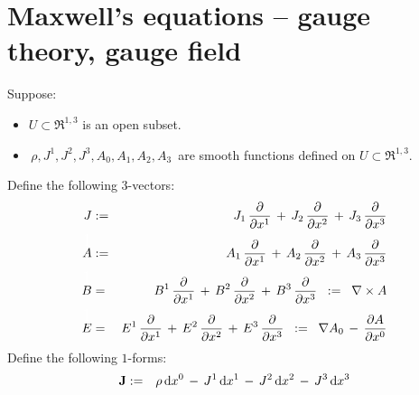 

\section{Maxwell's equations -- gauge theory, gauge field}
\setcounter{theorem}{0}
\setcounter{equation}{0}

\renewcommand{\theenumi}{\roman{enumi}}
\renewcommand{\labelenumi}{\textnormal{(\theenumi)}$\;\;$}


\begin{theorem}
\mbox{}
\vskip 0.2cm
\noindent
Suppose:
\begin{itemize}
\item
	$U \subset \Re^{1,3}$ is an open subset.
\item
	\,$\rho, J^{1}, J^{2}, J^{3}, A_{0}, A_{1}, A_{2}, A_{3}$\,
	are smooth functions defined on $U \subset \Re^{1,3}$.
\end{itemize}
\vskip 0.3cm
\noindent
Define the following $3$-vectors:
\begin{eqnarray*}
J
& := &
	J_{1}\,\dfrac{\partial}{\partial x^{1}} \,+\, J_{2}\,\dfrac{\partial}{\partial x^{2}} \,+\, J_{3}\,\dfrac{\partial}{\partial x^{3}}
\\
\overset{{\color{white}\textnormal{\Large$1$}}}{A}
& := &
	A_{1}\,\dfrac{\partial}{\partial x^{1}} \,+\, A_{2}\,\dfrac{\partial}{\partial x^{2}} \,+\, A_{3}\,\dfrac{\partial}{\partial x^{3}}
\\
\overset{{\color{white}\textnormal{\Large$1$}}}{B}
& = &
	B^{1}\,\dfrac{\partial}{\partial x^{1}} \,+\, B^{2}\,\dfrac{\partial}{\partial x^{2}} \,+\, B^{3}\,\dfrac{\partial}{\partial x^{3}}
\;\; := \;\;
	\nabla \times A
\\
\overset{{\color{white}\textnormal{\Large$1$}}}{E}
& = &
	E^{1}\,\dfrac{\partial}{\partial x^{1}} \,+\, E^{2}\,\dfrac{\partial}{\partial x^{2}} \,+\, E^{3}\,\dfrac{\partial}{\partial x^{3}}
\;\; := \;\;
	\nabla A_{0} \,-\, \dfrac{\partial A}{\partial x^{0}}
\end{eqnarray*}
\vskip 0.3cm
\noindent
Define the following $1$-forms:
\begin{eqnarray*}
\mathbf{J}
& := &
	\rho \, \d x^{0} \,-\, J^{1}\,\d x^{1} \,-\, J^{2}\,\d x^{2} \,-\, J^{3}\,\d x^{3}
\\

\end{eqnarray*}
\end{theorem}
